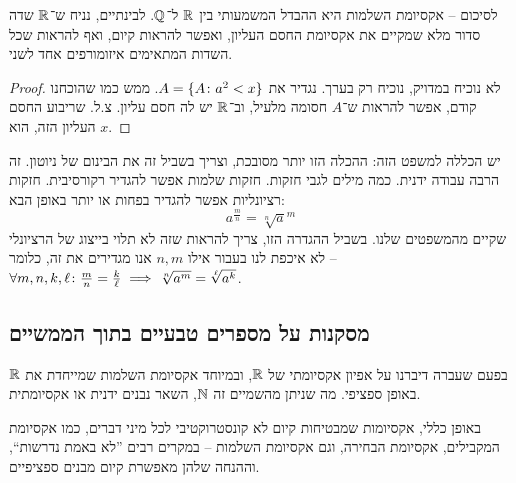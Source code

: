 \documentclass[name=רשימות חשבון דיפרנציאלי ואינטגרלי 1א]{../../../tex/classes/megasumPreamble}
\begin{document}
	לסיכום – אקסיומת השלמות היא ההבדל המשמעותי בין $\mathbb{R}$ ל־$\mathbb{Q}$. לבינתיים, נניח ש־$\mathbb{R}$ שדה סדור מלא שמקיים את אקסיומת החסם העליון, ואפשר להראות קיום, ואף להראות שכל השדות המתאימים איזומורפים אחד לשני.

	\begin{proof}
		לא נוכיח במדויק, נוכיח רק בערך. נגדיר את $A = \{A \colon a^2 < x\}$. ממש כמו שהוכחנו קודם, אפשר להראות ש־$A$ חסומה מלעיל, וב־$\mathbb{R}$ יש לה חסם עליון. צ.ל. שריבוע החסם העליון הזה, הוא $x$.
	\end{proof}
	יש הכללה למשפט הזה:
	ההכלה הזו יותר מסובכת, וצריך בשביל זה את הבינום של ניוטון. זה הרבה עבודה ידנית.
	כמה מילים לגבי חזקות. חזקות שלמות אפשר להגדיר רקורסיבית. חזקות רציונליות אפשר להגדיר בפחות או יותר באופן הבא:
	\[ a^{\frac{m}{n}} = \sqrt[n]{a}^{m} \]
	שקיים מהמשפטים שלנו. בשביל ההגדרה הזו, צריך להראות שזה לא תלוי בייצוג של הרציונלי – לא איכפת לנו בעבור אילו $n, m$ אנו מגדירים את זה, כלומר $\forall m, n, k, \ell \colon \frac{m}{n}  = \frac{k}{\ell} \implies \sqrt[n]{a^{m}} = \sqrt[\ell]{a^{k}}$.


	\subsection{מסקנות על מספרים טבעיים בתוך הממשיים}
	בפעם שעברה דיברנו על אפיון אקסיומתי של $\mathbb{R}$, ובמיוחד אקסיומת השלמות שמייחדת את $\mathbb{R}$ באופן ספציפי. מה שניתן מהשמיים זה $\mathbb{N}$, השאר נבנים ידנית או אקסיומתית.

	באופן כללי, אקסיומות שמבטיחות קיום לא קונסטרוקטיבי לכל מיני דברים, כמו אקסיומת המקבילים, אקסיומת הבחירה, וגם אקסיומת השלמות – במקרים רבים ''לא באמת נדרשות``, וההנחה שלהן מאפשרת קיום מבנים ספציפיים.
\end{document}
